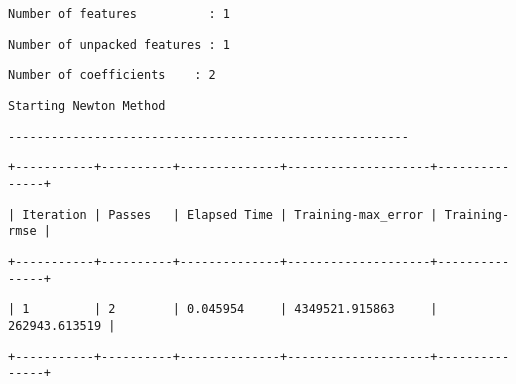 \documentclass[11pt]{article}
\begin{document}
    
    
    \begin{verbatim}
Number of features          : 1
    \end{verbatim}

    
    
    \begin{verbatim}
Number of unpacked features : 1
    \end{verbatim}

    
    
    \begin{verbatim}
Number of coefficients    : 2
    \end{verbatim}

    
    
    \begin{verbatim}
Starting Newton Method
    \end{verbatim}

    
    
    \begin{verbatim}
--------------------------------------------------------
    \end{verbatim}

    
    
    \begin{verbatim}
+-----------+----------+--------------+--------------------+---------------+
    \end{verbatim}

    
    
    \begin{verbatim}
| Iteration | Passes   | Elapsed Time | Training-max_error | Training-rmse |
    \end{verbatim}

    
    
    \begin{verbatim}
+-----------+----------+--------------+--------------------+---------------+
    \end{verbatim}

    
    
    \begin{verbatim}
| 1         | 2        | 0.045954     | 4349521.915863     | 262943.613519 |
    \end{verbatim}

    
    
    \begin{verbatim}
+-----------+----------+--------------+--------------------+---------------+
    \end{verbatim}
\end{document}

